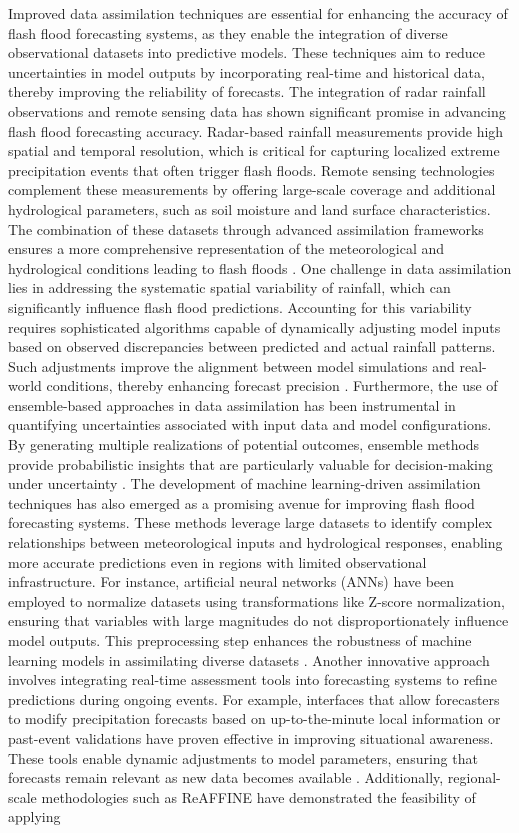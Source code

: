 Improved data assimilation techniques are essential for enhancing the accuracy of flash flood forecasting systems, as they enable the integration of diverse observational datasets into predictive models. These techniques aim to reduce uncertainties in model outputs by incorporating real-time and historical data, thereby improving the reliability of forecasts. The integration of radar rainfall observations and remote sensing data has shown significant promise in advancing flash flood forecasting accuracy. Radar-based rainfall measurements provide high spatial and temporal resolution, which is critical for capturing localized extreme precipitation events that often trigger flash floods. Remote sensing technologies complement these measurements by offering large-scale coverage and additional hydrological parameters, such as soil moisture and land surface characteristics. The combination of these datasets through advanced assimilation frameworks ensures a more comprehensive representation of the meteorological and hydrological conditions leading to flash floods \citep{Msigwa2024}. One challenge in data assimilation lies in addressing the systematic spatial variability of rainfall, which can significantly influence flash flood predictions. Accounting for this variability requires sophisticated algorithms capable of dynamically adjusting model inputs based on observed discrepancies between predicted and actual rainfall patterns. Such adjustments improve the alignment between model simulations and real-world conditions, thereby enhancing forecast precision \citep{Douinot2016}. Furthermore, the use of ensemble-based approaches in data assimilation has been instrumental in quantifying uncertainties associated with input data and model configurations. By generating multiple realizations of potential outcomes, ensemble methods provide probabilistic insights that are particularly valuable for decision-making under uncertainty \citep{Snook2019}. The development of machine learning-driven assimilation techniques has also emerged as a promising avenue for improving flash flood forecasting systems. These methods leverage large datasets to identify complex relationships between meteorological inputs and hydrological responses, enabling more accurate predictions even in regions with limited observational infrastructure. For instance, artificial neural networks (ANNs) have been employed to normalize datasets using transformations like Z-score normalization, ensuring that variables with large magnitudes do not disproportionately influence model outputs. This preprocessing step enhances the robustness of machine learning models in assimilating diverse datasets \citep{Ngo2018}. Another innovative approach involves integrating real-time assessment tools into forecasting systems to refine predictions during ongoing events. For example, interfaces that allow forecasters to modify precipitation forecasts based on up-to-the-minute local information or past-event validations have proven effective in improving situational awareness. These tools enable dynamic adjustments to model parameters, ensuring that forecasts remain relevant as new data becomes available \citep{Georgakakos2022}. Additionally, regional-scale methodologies such as ReAFFINE have demonstrated the feasibility of applying 